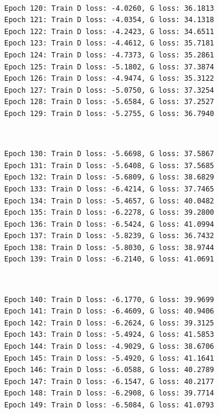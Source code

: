 \documentclass[11pt]{article}
\begin{document}
    \begin{center}
    \end{center}
    { \hspace*{\fill} \\}
    
    \begin{Verbatim}[commandchars=\\\{\}]
Epoch 120: Train D loss: -4.0260, G loss: 36.1813
Epoch 121: Train D loss: -4.0354, G loss: 34.1318
Epoch 122: Train D loss: -4.2423, G loss: 34.6511
Epoch 123: Train D loss: -4.4612, G loss: 35.7181
Epoch 124: Train D loss: -4.7373, G loss: 35.2861
Epoch 125: Train D loss: -5.1802, G loss: 37.3874
Epoch 126: Train D loss: -4.9474, G loss: 35.3122
Epoch 127: Train D loss: -5.0750, G loss: 37.3254
Epoch 128: Train D loss: -5.6584, G loss: 37.2527
Epoch 129: Train D loss: -5.2755, G loss: 36.7940

    \end{Verbatim}

    \begin{center}
    \end{center}
    { \hspace*{\fill} \\}
    
    \begin{Verbatim}[commandchars=\\\{\}]
Epoch 130: Train D loss: -5.6698, G loss: 37.5867
Epoch 131: Train D loss: -5.6408, G loss: 37.5685
Epoch 132: Train D loss: -5.6809, G loss: 38.6829
Epoch 133: Train D loss: -6.4214, G loss: 37.7465
Epoch 134: Train D loss: -5.4657, G loss: 40.0482
Epoch 135: Train D loss: -6.2278, G loss: 39.2800
Epoch 136: Train D loss: -6.5424, G loss: 41.0994
Epoch 137: Train D loss: -5.8239, G loss: 36.7432
Epoch 138: Train D loss: -5.8030, G loss: 38.9744
Epoch 139: Train D loss: -6.2140, G loss: 41.0691

    \end{Verbatim}

    \begin{center}
    \end{center}
    { \hspace*{\fill} \\}
    
    \begin{Verbatim}[commandchars=\\\{\}]
Epoch 140: Train D loss: -6.1770, G loss: 39.9699
Epoch 141: Train D loss: -6.4609, G loss: 40.9406
Epoch 142: Train D loss: -6.2624, G loss: 39.3125
Epoch 143: Train D loss: -5.4924, G loss: 41.5853
Epoch 144: Train D loss: -4.9029, G loss: 38.6706
Epoch 145: Train D loss: -5.4920, G loss: 41.1641
Epoch 146: Train D loss: -6.0588, G loss: 40.2789
Epoch 147: Train D loss: -6.1547, G loss: 40.2177
Epoch 148: Train D loss: -6.2908, G loss: 39.7714
Epoch 149: Train D loss: -6.5084, G loss: 41.0793

    \end{Verbatim}
\end{document}
